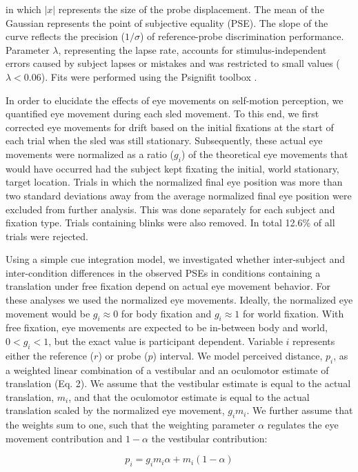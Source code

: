 in which $|x|$ represents the size of the probe displacement. The mean of the Gaussian represents the point of subjective equality (PSE). The slope of the curve reflects the precision ($1/\sigma$) of reference-probe discrimination performance. Parameter $\lambda$, representing the lapse rate, accounts for stimulus-independent errors caused by subject lapses or mistakes and was restricted to small values ($\lambda < 0.06$). Fits were performed using the Psignifit toolbox \cite{wichmann2001,wichmann2001b}.

In order to elucidate the effects of eye movements on self-motion perception, we quantified eye movement during each sled movement. To this end, we first corrected eye movements for drift based on the initial fixations at the start of each trial when the sled was still stationary. Subsequently, these actual eye movements were normalized as a ratio ($g_i$) of the theoretical eye movements that would have occurred had the subject kept fixating the initial, world stationary, target location. Trials in which the normalized final eye position was more than two standard deviations away from the average normalized final eye position were excluded from further analysis. This was done separately for each subject and fixation type. Trials containing blinks were also removed. In total 12.6\% of all trials were rejected.

Using a simple cue integration model, we investigated whether inter-subject and inter-condition differences in the observed PSEs in conditions containing a translation under free fixation depend on actual eye movement behavior. For these analyses we used the normalized eye movements. Ideally, the normalized eye movement would be $g_i \approx 0$ for body fixation and $g_i \approx 1$ for world fixation. With free fixation, eye movements are expected to be in-between body and world, $0 < g_i < 1$, but the exact value is participant dependent. Variable $i$ represents either the reference ($r$) or probe ($p$) interval. We model perceived distance, $p_i$, as a weighted linear combination of a vestibular and an oculomotor estimate of translation (Eq. 2). We assume that the vestibular estimate is equal to the actual translation, $m_i$, and that the oculomotor estimate is equal to the actual translation scaled by the normalized eye movement, $g_i m_i$. We further assume that the weights sum to one, such that the weighting parameter $\alpha$ regulates the eye movement contribution and $1 - \alpha$ the vestibular contribution:

\begin{equation}
\label{p3:eq2}
p_i = g_i m_i \alpha + m_i (1 - \alpha)
\end{equation}

